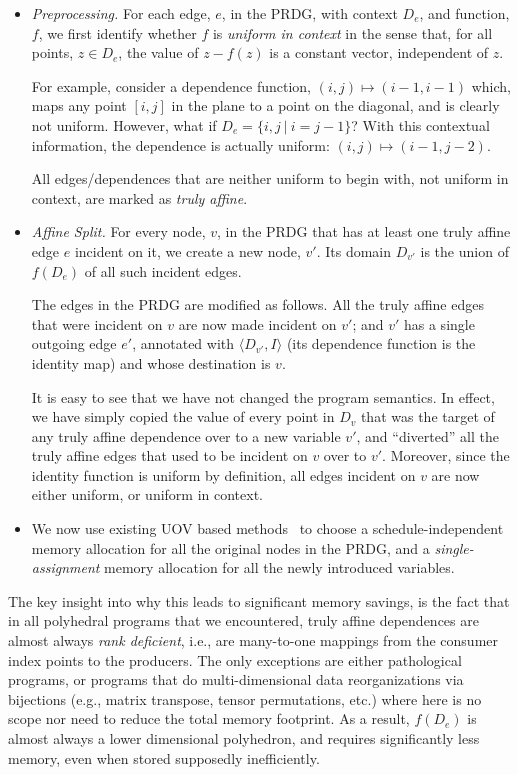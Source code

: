 \begin{itemize}
\item \emph{Preprocessing.}  For each edge, $e$, in the PRDG, with context
  $D_e$, and function, $f$, we first identify whether $f$ is \emph{uniform in
    context} in the sense that, for all points, $z\in D_e$, the value of
  $z-f(z)$ is a constant vector, independent of $z$.

  For example, consider a dependence function, $(i,j) \mapsto (i-1,i-1)$
  which, maps any point $[i,j]$ in the plane to a point on the diagonal, and
  is clearly not uniform.  However, what if $D_e = \{i,j~|~i=j-1\}$?  With
  this contextual information, the dependence is actually uniform: $(i, j)
  \mapsto (i-1, j-2)$.

  All edges/dependences that are neither uniform to begin with, not uniform in
  context, are marked as \emph{truly affine}.
\item \emph{Affine Split.}  For every node, $v$, in the PRDG that has at least
  one truly affine edge $e$ incident on it, we create a new node, $v'$.  Its
  domain $D_{v'}$ is the union of $f(D_e)$ of all such incident edges.

  The edges in the PRDG are modified as follows.  All the truly affine edges
  that were incident on $v$ are now made incident on $v'$; and $v'$ has a
  single outgoing edge $e'$, annotated with $\langle D_{v'}, I \rangle$ (its
  dependence function is the identity map) and whose destination is $v$.

  It is easy to see that we have not changed the program semantics.  In
  effect, we have simply copied the value of every point in $D_v$ that was the
  target of any truly affine dependence over to a new variable $v'$, and
  ``diverted'' all the truly affine edges that used to be incident on $v$ over
  to $v'$.  Moreover, since the identity function is uniform by definition, all
  edges incident on $v$ are now either uniform, or uniform in context.
\item We now use existing UOV based methods~\cite{strout-etal-asplos98,
    sanjay-memory-2011} to choose a schedule-independent memory allocation for
  all the original nodes in the PRDG, and a \emph{single-assignment} memory
  allocation for all the newly introduced variables.
\end{itemize}

The key insight into why this leads to significant memory savings, is the fact
that in all polyhedral programs that we encountered, truly affine dependences
are almost always \emph{rank deficient}, i.e., are many-to-one mappings from
the consumer index points to the producers.  The only exceptions are either
pathological programs, or programs that do multi-dimensional data
reorganizations via bijections (e.g., matrix transpose, tensor permutations,
etc.) where here is no scope nor need to reduce the total memory footprint.
As a result, $f(D_e)$ is almost always a lower dimensional polyhedron, and
requires significantly less memory, even when stored supposedly inefficiently.


